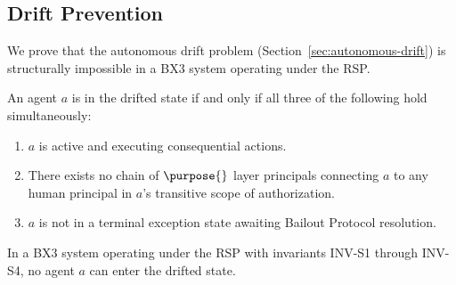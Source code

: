 \subsection{Drift Prevention}
\label{sec:drift-prevention}

We prove that the autonomous drift problem (Section~\ref{sec:autonomous-drift}) is structurally impossible in a BX3 system operating under the RSP.

\begin{definition}[Drift]
An agent $a$ is in the drifted state if and only if all three of the following hold simultaneously:
\begin{enumerate}
    \item $a$ is active and executing consequential actions.
    \item There exists no chain of $\purpose{}$ layer principals connecting $a$ to any human principal in $a$'s transitive scope of authorization.
    \item $a$ is not in a terminal exception state awaiting Bailout Protocol resolution.
\end{enumerate}
\end{definition}

\begin{theorem}
In a BX3 system operating under the RSP with invariants INV-S1 through INV-S4, no agent $a$ can enter the drifted state.
\end{theorem}

